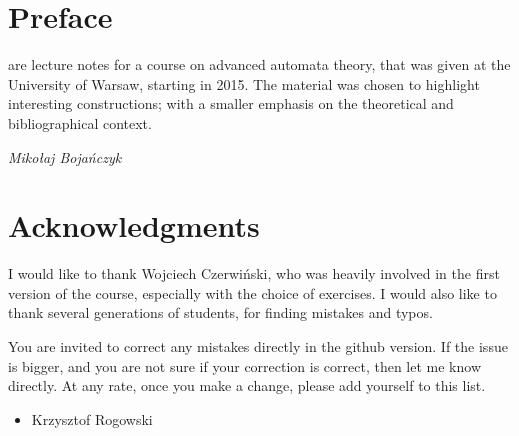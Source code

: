 \documentclass[b5paper,11pt]{book}
\begin{document}
\chapter*{Preface}%
{  \raggedright
{} are lecture notes for a course on advanced automata theory, that was given at the University of Warsaw, starting in 2015.  
The material was chosen to highlight interesting constructions; with a smaller emphasis on  the theoretical and bibliographical context.  




\bigskip
{\slshape  \noindent Miko{\l}aj Boja\'nczyk}


\cleardoublepage

%      
\chapter*{Acknowledgments}%
{  \raggedright
I would like to thank Wojciech Czerwi\'nski, who was heavily involved in the first version of the course, especially with the choice of exercises. I would also like to thank several generations of students, for finding mistakes and typos.

You are invited to correct any mistakes directly in the github version. If the issue is bigger, and you are not sure if your correction is correct, then let me know directly. At any rate, once you make a change, please add yourself to this list. 

\begin{itemize}
    \item Krzysztof Rogowski
\end{itemize}




\cleardoublepage


%      
\tableofcontents
\thispagestyle{empty}

\mainmatter   %
\pagestyle{fancy}

\newcommand{\rozdzial}[2]{ 
\chapter{#1}
\seclabel{sec:#2}
\secintro{}

}

\newcommand{\bookcontent}{
\rozdzial{Presburger arithmetic}{presburger}
\rozdzial{First-order theory of the reals}{tarski}
\rozdzial{Zero-one laws}{random-graph}
\rozdzial{Weighted automata over a field}{linear-automata}
\rozdzial{Vector addition systems}{wqo}
\rozdzial{Polynomial grammars}{hilbert}


}}}
\end{document}
